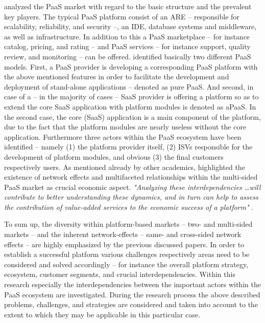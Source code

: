 \citet{Beimborn2011} analyzed the \ac{PaaS} market with regard to the basic structure and the prevalent key players. The typical \ac{PaaS} platform consist of an \ac{ARE} -- responsible for scalability, reliability, and security --, an \ac{IDE}, database systems and middleware, as well as infrastructure. In addition to this a \ac{PaaS} marketplace -- for instance catalog, pricing, and rating -- and \ac{PaaS} services -- for instance support, quality review, and monitoring -- can be offered. \citet{Beimborn2011} identified basically two different \ac{PaaS} models. First, a \ac{PaaS} provider is developing a corresponding \ac{PaaS} platform with the above mentioned features in order to facilitate the development and deployment of stand-alone applications -- denoted as pure \ac{PaaS}. And second, in case of a -- in the majority of cases -- \ac{SaaS} provider is offering a platform so as to extend the core \ac{SaaS} application with platform modules is denoted as \ac{aPaaS}. In the second case, the core (\ac{SaaS}) application is a main component of the platform, due to the fact that the platform modules are nearly useless without the core application. Furthermore three actors within the \ac{PaaS} ecosystem have been identified -- namely (1) the platform provider itself, (2) \acp{ISV} responsible for the development of platform modules, and obvious (3) the final customers respectively users. As mentioned already by other academics, \citet{Beimborn2011} highlighted the existence of network effects and multifaceted relationships within the multi-sided \ac{PaaS} market as crucial economic aspect. \textit{"Analyzing these interdependencies \ldots will contribute to better understanding these dynamics, and in turn can help to assess the contribution of value-added services to the economic success of a platform"} \citep[p. 84]{Beimborn2011}.

To sum up, the diversity within platform-based markets -- two- and multi-sided markets -- and the inherent network-effects -- same- and cross-sided network effects -- are highly emphasized by the previous discussed papers. In order to establish a successful platform various challenges respectively areas need to be considered and solved accordingly -- for instance the overall platform strategy, ecosystem, customer segments, and crucial interdependencies. Within this research especially the interdependencies between the important actors within the \ac{PaaS} ecosystem are investigated. During the research process the above described problems, challenges, and strategies are considered and taken into account to the extent to which they may be applicable in this particular case.

